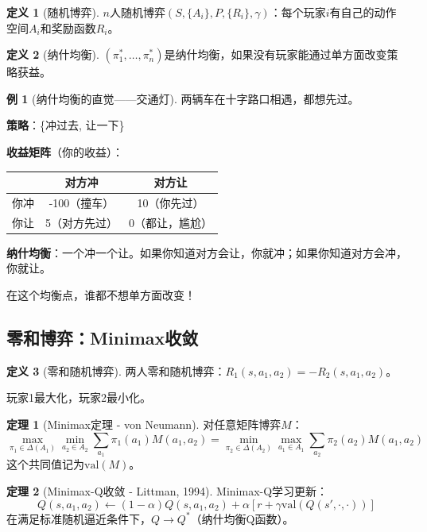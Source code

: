 \documentclass[11pt,a4paper]{article}
\theoremstyle{definition}
\newtheorem{definition}{定义}[section]
\newtheorem{example}{例}[section]
\newtheorem{theorem}{定理}[section]
\begin{document}
\begin{definition}[随机博弈]
$n$人随机博弈$(S, \{A_i\}, P, \{R_i\}, \gamma)$：每个玩家$i$有自己的动作空间$A_i$和奖励函数$R_i$。
\end{definition}

\begin{definition}[纳什均衡]
$(\pi_1^*, \ldots, \pi_n^*)$是纳什均衡，如果没有玩家能通过单方面改变策略获益。
\end{definition}

\begin{example}[纳什均衡的直觉——交通灯]
两辆车在十字路口相遇，都想先过。

\textbf{策略}：\{冲过去, 让一下\}

\textbf{收益矩阵}（你的收益）：
\begin{center}
\begin{tabular}{c|cc}
& 对方冲 & 对方让 \\
\hline
你冲 & -100（撞车） & 10（你先过） \\
你让 & 5（对方先过） & 0（都让，尴尬）
\end{tabular}
\end{center}

\textbf{纳什均衡}：一个冲一个让。如果你知道对方会让，你就冲；如果你知道对方会冲，你就让。

在这个均衡点，谁都不想单方面改变！
\end{example}

\subsection{零和博弈：Minimax收敛}

\begin{definition}[零和随机博弈]
两人零和随机博弈：$R_1(s, a_1, a_2) = -R_2(s, a_1, a_2)$。

玩家1最大化，玩家2最小化。
\end{definition}

\begin{theorem}[Minimax定理 - von Neumann]
对任意矩阵博弈$M$：
\[
\max_{\pi_1 \in \Delta(A_1)} \min_{a_2 \in A_2} \sum_{a_1} \pi_1(a_1) M(a_1, a_2) = \min_{\pi_2 \in \Delta(A_2)} \max_{a_1 \in A_1} \sum_{a_2} \pi_2(a_2) M(a_1, a_2)
\]
这个共同值记为$\text{val}(M)$。
\end{theorem}

\begin{theorem}[Minimax-Q收敛 - Littman, 1994]
Minimax-Q学习更新：
\[
Q(s, a_1, a_2) \leftarrow (1-\alpha)Q(s,a_1,a_2) + \alpha[r + \gamma \text{val}(Q(s', \cdot, \cdot))]
\]
在满足标准随机逼近条件下，$Q \to Q^*$（纳什均衡Q函数）。
\end{theorem}
\end{document}
